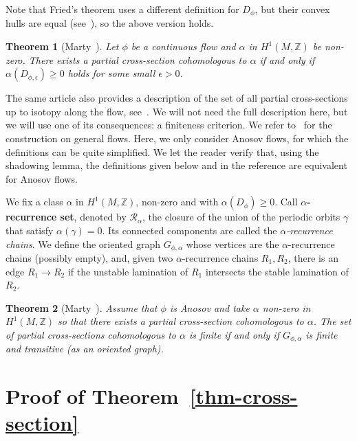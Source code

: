 \documentclass[colorinlistoftodos,12pt]{article}
\newcommand{\ZZ}{\mathbb{Z}}
\newcommand{\Rec}{\mathcal{R}}
\theoremstyle{colorplain}
\newtheorem{theorem}{Theorem}
\numberwithin{theorem}{section}
\theoremstyle{colorremarkbis}
\theoremstyle{colorremark}
\theoremstyle{colordefinition}
\begin{document}
Note that Fried's theorem uses a different definition for $D_\phi$, but their convex hulls are equal (see~\cite[Appendix]{marty2025partialI}), so the above version holds.

\begin{theorem}[Marty~\cite{marty2025partialII}]\label{thm-ps-existence}
	Let $\phi$ be a continuous flow and $\alpha$ in $H^1(M,\ZZ)$ be non-zero. There exists a partial cross-section cohomologous to $\alpha$ if and only if $\alpha(D_{\phi,\epsilon})\geq0$ holds for some small $\epsilon>0$.
\end{theorem}

The same article also provides a description of the set of all partial cross-sections up to isotopy along the flow, see~\cite[Theorem B]{marty2025partialII}. We will not need the full description here, but we will use one of its consequences: a finiteness criterion. We refer to~\cite{marty2025partialII} for the construction on general flows. Here, we only consider Anosov flows, for which the definitions can be quite simplified. We let the reader verify that, using the shadowing lemma, the definitions given below and in the reference are equivalent for Anosov flows.

We fix a class $\alpha$ in $H^1(M,\ZZ)$, non-zero and with $\alpha(D_\phi)\geq0$. Call \textbf{$\alpha$-recurrence set}, denoted by $\Rec_\alpha$, the closure of the union of the periodic orbits $\gamma$ that satisfy $\alpha(\gamma)=0$. Its connected components are called the \emph{$\alpha$-recurrence chains}. We define the oriented graph $G_{\phi,\alpha}$ whose vertices are the $\alpha$-recurrence chains (possibly empty), and, given two $\alpha$-recurrence chains $R_1,R_2$, there is an edge $R_1\to R_2$ if the unstable lamination of $R_1$ intersects the stable lamination of $R_2$.

\begin{theorem}[Marty~\cite{marty2025partialII}]\label{thm-ps-finiteness}
	Assume that $\phi$ is Anosov and take $\alpha$ non-zero in $H^1(M,\ZZ)$ so that there exists a partial cross-section cohomologous to $\alpha$. The set of partial cross-sections cohomologous to $\alpha$ is finite if and only if $G_{\phi,\alpha}$ is finite and transitive (as an oriented graph).
\end{theorem}



\section{Proof of Theorem~\ref{thm-cross-section}}\label{sec-proof-A}
\end{document}
